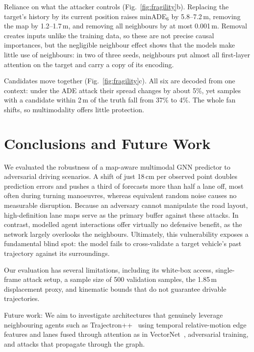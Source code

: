 \documentclass[conference]{IEEEtran}
\newcommand{\minade}{minADE$_6$}
\begin{document}
Reliance on what the attacker controls (Fig.~\ref{fig:fragility}b). Replacing the target's history by its current position raises \minade{} by 5.8--7.2\,m, removing the map by 1.2--1.7\,m, and removing all neighbours by at most 0.001\,m. Removal creates inputs unlike the training data, so these are not precise causal importances, but the negligible neighbour effect shows that the models make little use of neighbours: in two of three seeds, neighbours put almost all first-layer attention on the target and carry a copy of its encoding.

Candidates move together (Fig.~\ref{fig:fragility}c). All six are decoded from one context: under the ADE attack their spread changes by about 5\%, yet samples with a candidate within 2\,m of the truth fall from 37\% to 4\%. The whole fan shifts, so multimodality offers little protection.

\section{Conclusions and Future Work}
We evaluated the robustness of a map-aware multimodal GNN predictor to adversarial driving scenarios. A shift of just 18\,cm per observed point doubles prediction errors and pushes a third of forecasts more than half a lane off, most often during turning manoeuvres, whereas equivalent random noise causes no measurable disruption. Because an adversary cannot manipulate the road layout, high-definition lane maps serve as the primary buffer against these attacks. In contrast, modelled agent interactions offer virtually no defensive benefit, as the network largely overlooks the neighbours. Ultimately, this vulnerability exposes a fundamental blind spot: the model fails to cross-validate a target vehicle's past trajectory against its surroundings.

Our evaluation has several limitations, including its white-box access, single-frame attack setup, a sample size of 500 validation samples, the 1.85\,m displacement proxy, and kinematic bounds that do not guarantee drivable trajectories.

Future work: We aim to investigate architectures that genuinely leverage neighbouring agents such as Trajectron++~\cite{salzmann2020trajectron} using temporal relative-motion edge features and lanes fused through attention as in VectorNet~\cite{gao2020vectornet}, adversarial training, and attacks that propagate through the graph.



\end{document}
